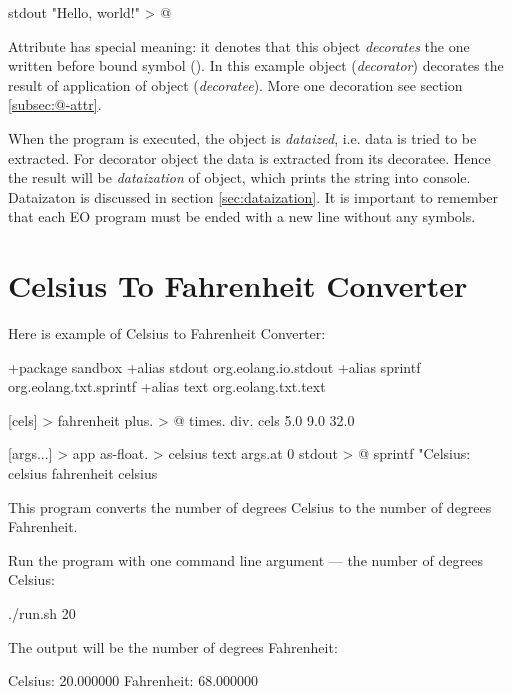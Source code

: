 \documentclass[12pt]{book}
\begin{document}
\begin{ffcode}
stdout "Hello, world!\n" > @
\end{ffcode}
Attribute  has special meaning: it denotes that this object \textit{decorates} the one written before bound symbol (\ff{>}). In this example object  (\textit{decorator}) decorates the result of application of object  (\textit{decoratee}). More one decoration see section \ref{subsec:@-attr}.

When the program is executed, the  object is \textit{dataized}, i.e. data is tried to be extracted. For decorator object the data is extracted from its decoratee. Hence the result will be \textit{dataization} of  object, which prints the string into console. Dataizaton is discussed in section \ref{sec:dataization}. It is important to remember that each EO program must be ended with a new line without any symbols.

\section{Celsius To Fahrenheit Converter}

Here is example of Celsius to Fahrenheit Converter:

\begin{ffcode}
+package sandbox
+alias stdout org.eolang.io.stdout
+alias sprintf org.eolang.txt.sprintf
+alias text org.eolang.txt.text

[cels] > fahrenheit
  plus. > @
    times.
      div.
        cels
        5.0
      9.0
    32.0

[args...] > app
  as-float. > celsius
    text
      args.at 0
  stdout > @
    sprintf
      "Celsius: %
      celsius
      fahrenheit celsius
\end{ffcode}

This program converts the number of degrees Celsius to the number of degrees Fahrenheit. 

Run the program with one command line argument —  the number of degrees Celsius:
\begin{ffcode}
./run.sh 20
\end{ffcode}
The output will be the number of degrees Fahrenheit:
\begin{ffcode}
Celsius: 20.000000
Fahrenheit: 68.000000
\end{ffcode}
\end{document}
